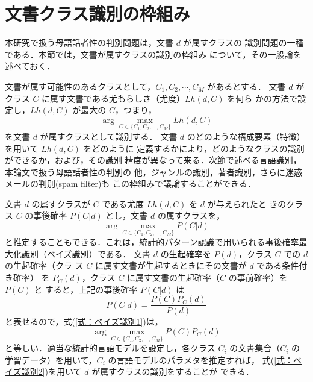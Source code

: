 \documentclass[japanese]{jnlp_1.4}
\begin{document}
\section{文書クラス識別の枠組み}
\label{節：文書クラス識別の枠組み}

本研究で扱う母語話者性の判別問題は，文書 $d$ が属すクラスの
識別問題の一種である．本節では，文書が属すクラスの識別の枠組み
について，その一般論を述べておく．

文書が属す可能性のあるクラスとして，$C_1,C_2,\cdots, C_M$ があるとする．
文書 $d$ がクラス $C$ に属す文書である尤もらしさ（尤度）$Lh(d,C)$ を何ら
かの方法で設定し，$Lh(d,C)$ が最大の $C$，つまり，
\[
 \arg\max_{C\in\{C_1,C_2,\cdots,C_M\}} Lh(d,C)
\]
を文書 $d$ が属すクラスとして識別する．
文書 $d$ のどのような構成要素（特徴）を用いて $Lh(d,C)$ をどのように
定義するかにより，どのようなクラスの識別ができるか，および，その識別
精度が異なって来る．次節で述べる言語識別，本論文で扱う母語話者性の判別の
他，ジャンルの識別，著者識別，さらに迷惑メールの判別(spam filter)も
この枠組みで議論することができる．

文書 $d$ の属すクラスが $C$ である尤度 $Lh(d,C)$ を $d$ が与えられたと
きのクラス $C$ の事後確率 $P(C|d)$ とし，文書 $d$ の属すクラスを，
\begin{equation}\label{式：ベイズ識別1}
 \arg\max_{C\in\{C_1,C_2,\cdots,C_M\}} P(C|d)
\end{equation}
と推定することもできる．これは，統計的パターン認識で用いられる事後確率最
大化識別（ベイズ識別）\cite{パターン認識テキスト}である．
文書 $d$ の生起確率を $P(d)$，クラス $C$ での $d$ の生起確率（クラ
ス $C$ に属す文書が生起するときにその文書が $d$ である条件付き確率）
を $P_C(d)$，クラス $C$ に属す文書の生起確率（$C$ の事前確率）を $P(C)$ と
すると，上記の事後確率 $P(C|d)$ は
\[
 P(C|d)=\frac{P(C)P_C(d)}{P(d)}
\]
と表せるので，式(\ref{式：ベイズ識別1})は，
\begin{equation}\label{式：ベイズ識別2}
 \arg\max_{C\in\{C_1,C_2,\cdots,C_M\}} P(C)P_C(d)
\end{equation}
と等しい．適当な統計的言語モデルを設定し，各クラス $C_i$ の文書集合（$C_i$ の
学習データ）を用いて，$C_i$ の言語モデルのパラメタを推定すれば，
式(\ref{式：ベイズ識別2})を用いて $d$ が属すクラスの識別をすることが
できる．
\end{document}
